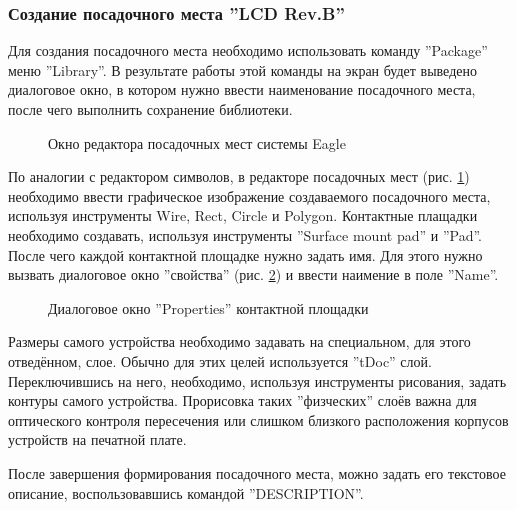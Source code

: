 \subsubsection{Создание посадочного места ''LCD Rev.B''}
\begin{par}
Для создания посадочного места необходимо использовать команду
''Pa\-cka\-ge'' меню ''Library''.
В результате работы этой команды на экран будет выведено диалоговое окно,
в котором нужно ввести наименование посадочного места, после чего
выполнить сохранение библиотеки.
\end{par}
\begin{figure}[h]
	\caption{Окно редактора посадочных мест системы Eagle}
	\label{img:package}
\end{figure}

\begin{par}
По аналогии с редактором символов, в редакторе посадочных мест (рис. \ref{img:package})
необходимо ввести графическое изображение создаваемого посадочного места,
используя инструменты Wire, Rect, Circle и Polygon. 
Контактные плащадки необходимо создавать, используя инструменты ''Surface mount pad'' и ''Pad''.
После чего каждой контактной площадке нужно задать имя. Для этого нужно вызвать диалоговое
окно ''свойства'' (рис. \ref{img:padProperty})  и ввести наимение в поле ''Name''.
\end{par}
\begin{figure}[h]
	\caption{Диалоговое окно ''Properties'' контактной площадки}
	\label{img:padProperty}
\end{figure}

Размеры самого устройства необходимо задавать на специальном, для этого отведённом, слое.
Обычно для этих целей используется ''tDoc'' слой. Переключившись на него, необходимо, используя
инструменты рисования, задать контуры самого устройства. Прорисовка таких ''физческих'' слоёв
важна для  оптического контроля пересечения или слишком близкого расположения корпусов
устройств на печатной плате.

После завершения формирования посадочного места, можно задать его текстовое описание,
воспользовавшись командой ''DESCRIPTION''.

